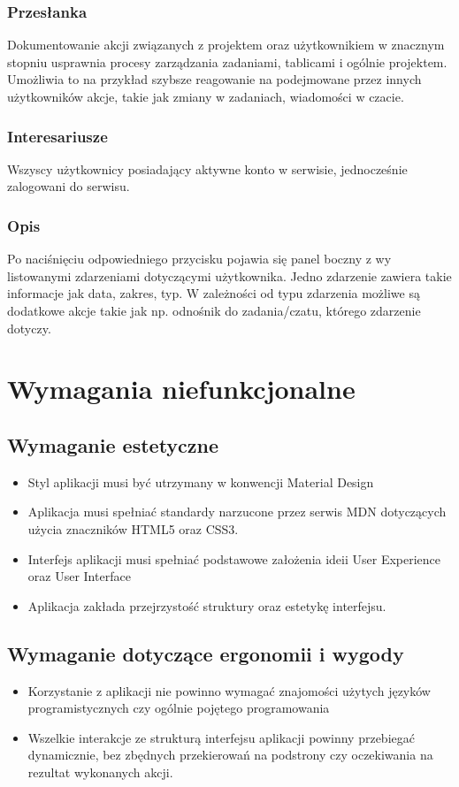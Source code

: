 \documentclass[eng,printmode]{mgr}
\begin{document}
\subsubsection{Przesłanka}
Dokumentowanie akcji związanych z projektem oraz użytkownikiem w znacznym stopniu usprawnia procesy zarządzania zadaniami, tablicami i ogólnie projektem. Umożliwia to na przykład szybsze reagowanie na podejmowane przez innych użytkowników akcje, takie jak zmiany w zadaniach, wiadomości w czacie.

\subsubsection{Interesariusze}
Wszyscy użytkownicy posiadający aktywne konto w serwisie, jednocześnie zalogowani do serwisu.

\subsubsection{Opis}
Po naciśnięciu odpowiedniego przycisku pojawia się panel boczny z wy listowanymi zdarzeniami dotyczącymi użytkownika. Jedno zdarzenie zawiera takie informacje jak data, zakres, typ. W zależności od typu zdarzenia możliwe są dodatkowe akcje takie jak np. odnośnik do zadania/czatu, którego zdarzenie dotyczy.

\section{Wymagania niefunkcjonalne}
\subsection{Wymaganie estetyczne}
\begin{itemize}
  \item Styl aplikacji musi być utrzymany w konwencji Material Design\cite{Material}
  \item Aplikacja musi spełniać standardy narzucone przez serwis MDN\cite {MDN_HTML}\cite {MDN_CSS} dotyczących użycia znaczników HTML5 oraz CSS3.
  \item Interfejs aplikacji musi spełniać podstawowe założenia ideii User Experience oraz User Interface\cite {Keyword_UserInterface}
  \item Aplikacja zakłada przejrzystość struktury oraz estetykę interfejsu.
\end{itemize} 

\subsection{Wymaganie dotyczące ergonomii i wygody}
\begin{itemize}
  \item Korzystanie z aplikacji nie powinno wymagać znajomości użytych języków programistycznych czy ogólnie pojętego programowania
  \item Wszelkie interakcje ze strukturą interfejsu aplikacji powinny przebiegać dynamicznie, bez zbędnych przekierowań na podstrony  czy oczekiwania na rezultat wykonanych akcji.
\end{itemize}
\end{document}
